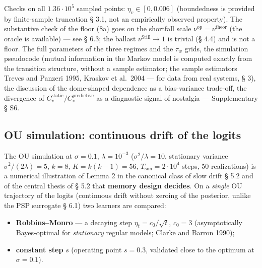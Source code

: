 \documentclass[pdflatex,sn-mathphys-ay]{sn-jnl}
\providecommand{\tightlist}{\setlength{\itemsep}{0pt}\setlength{\parskip}{0pt}}
\begin{document}
Checks on all \(1.36 \cdot 10^5\) sampled points: \(\eta_v \in [0, 0.006]\) (boundedness is provided by finite-sample truncation § 3.1, not an empirically observed property). The substantive check of the floor (8a) goes on the shortfall scale \(\nu^{\text{op}} = \nu^{\text{theor}}\) (the oracle is available) --- see § 6.3; the ballast \(\nu^{\text{Still}} \to 1\) is trivial (§ 4.4) and is not a floor. The full parameters of the three regimes and the \(\tau_w\) grids, the simulation pseudocode (mutual information in the Markov model is computed exactly from the transition structure, without a sample estimator; the sample estimators Treves and Panzeri 1995, Kraskov et al.~2004 --- for data from real systems, § 3), the discussion of the dome-shaped dependence as a bias-variance trade-off, the divergence of \(C_v^{\text{static}}/C_v^{\text{predictive}}\) as a diagnostic signal of nostalgia --- Supplementary § S6.



\subsection{OU simulation: continuous drift of the logits}\label{ou-simulation-continuous-drift-of-the-logits}



The OU simulation at \(\sigma = 0.1\), \(\lambda = 10^{-3}\) (\(\sigma^2/\lambda = 10\), stationary variance \(\sigma^2/(2\lambda) = 5\), \(k = 8\), \(K = k(k-1) = 56\), \(T_{\text{sim}} = 2 \cdot 10^4\) steps, 50 realizations) is a numerical illustration of Lemma 2 in the canonical class of slow drift § 5.2 and of the central thesis of § 5.2 that \textbf{memory design decides}. On a \emph{single} OU trajectory of the logits (continuous drift without zeroing of the posterior, unlike the PSP surrogate § 6.1) two learners are compared:



\begin{itemize}

\tightlist

\item

  \textbf{Robbins--Monro} --- a decaying step \(\eta_t = c_0/\sqrt t\), \(c_0 = 3\) (asymptotically Bayes-optimal for \emph{stationary} regular models; Clarke and Barron 1990);

\item

  \textbf{constant step} \(s\) (operating point \(s = 0.3\), validated close to the optimum at \(\sigma = 0.1\)).

\end{itemize}
\end{document}
